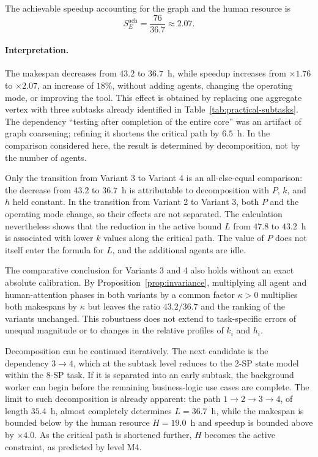 The achievable speedup accounting for the graph and the human resource is
\[
  S_E^{\text{ach}} = \frac{76}{36.7} \approx 2.07.
\]

\paragraph{Interpretation.}
The makespan decreases from $43.2$ to $36.7$~h, while speedup increases from
$\times 1.76$ to $\times 2.07$, an increase of $18\%$, without adding agents,
changing the operating mode, or improving the tool. This effect is obtained by
replacing one aggregate vertex with three subtasks already identified in
Table~\ref{tab:practical-subtasks}. The dependency ``testing after completion
of the entire core'' was an artifact of graph coarsening; refining it shortens
the critical path by $6.5$~h. In the comparison considered here, the result is
determined by decomposition, not by the number of agents.

Only the transition from Variant 3 to Variant 4 is an all-else-equal
comparison: the decrease from $43.2$ to $36.7$~h is attributable to
decomposition with $P$, $k$, and $h$ held constant. In the transition from
Variant 2 to Variant 3, both $P$ and the operating mode change, so their effects
are not separated. The calculation nevertheless shows that the reduction in
the active bound $L$ from $47.8$ to $43.2$~h is associated with lower $k$
values along the critical path. The value of $P$ does not itself enter the
formula for $L$, and the additional agents are idle.

The comparative conclusion for Variants 3 and 4 also holds without an exact
absolute calibration. By Proposition~\ref{prop:invariance}, multiplying all
agent and human-attention phases in both variants by a common factor
$\kappa>0$ multiplies both makespans by $\kappa$ but leaves the ratio
$43.2/36.7$ and the ranking of the variants unchanged. This robustness does
not extend to task-specific errors of unequal magnitude or to changes in the
relative profiles of $k_i$ and $h_i$.

Decomposition can be continued iteratively. The next candidate is the
dependency $3 \to 4$, which at the subtask level reduces to the 2-SP state model
within the 8-SP task. If it is separated into an early subtask, the background
worker can begin before the remaining business-logic use cases are complete.
The limit to such decomposition is already apparent: the path
$1 \to 2 \to 3 \to 4$, of length $35.4$~h, almost completely determines
$L = 36.7$~h, while the makespan is bounded below by the human resource
$H = 19.0$~h and speedup is bounded above by $\times 4.0$. As the critical path
is shortened further, $H$ becomes the active constraint, as predicted by level
M4.
